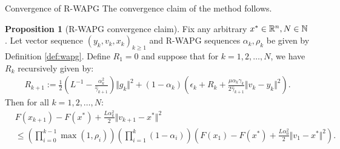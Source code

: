 \documentclass[11pt]{beamer}
\theoremstyle{definition}
\newtheorem{proposition}{Proposition}[section]
\begin{document}
        \begin{frame}{Convergence of R-WAPG}
            The convergence claim of the method follows. 
            \begin{proposition}[R-WAPG convergence claim]\label{prop:wagp-convergence}
                Fix any arbitrary $x^* \in \mathbb R^n, N \in \mathbb N$. 
                Let vector sequence $(y_k, v_{k}, x_{k})_{k \ge 1}$ and R-WAPG sequences $\alpha_k, \rho_k$ be given by Definition \ref{def:wapg}. 
                Define $R_1 = 0$ and suppose that for $k = 1, 2, \ldots, N$, we have $R_k$ recursively given by: 
                {\scriptsize
                \begin{align*}
                    R_{k + 1}
                    := 
                    \frac{1}{2}\left(
                        L^{-1} - \frac{\alpha_k^2}{\hat \gamma_{k + 1}}
                    \right)\Vert g_k\Vert^2
                    + 
                    (1 - \alpha_k)
                    \left(
                        \epsilon_k + R_k + 
                        \frac{\mu\alpha_k\gamma_k}{2\hat \gamma_{k + 1}}
                        \Vert v_k - y_k\Vert^2
                    \right). 
                \end{align*}
                }
                Then for all $k = 1, 2, \ldots, N$: 
                {\scriptsize
                \begin{align*}
                    & F(x_{k + 1}) - F(x^*) + \frac{L \alpha_k^2}{2}\Vert v_{k + 1} - x^*\Vert^2
                    \\
                    &\le 
                    \left(
                        \prod_{i = 0}^{k - 1} \max(1, \rho_{i})
                    \right)
                    \left(
                        \prod_{i = 1}^{k} \left(1  - \alpha_i\right)
                    \right)
                    \left(
                        F(x_1) - F(x^*) + \frac{L\alpha_0^2}{2}\Vert v_1 - x^*\Vert^2
                    \right). 
                \end{align*}
                }
            \end{proposition}
        \end{frame}
\end{document}
